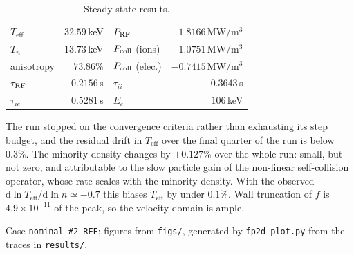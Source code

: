 \documentclass[11pt,a4paper]{article}
\newcommand{\code}[1]{\texttt{\small #1}}
\newcommand{\Teff}{T_{\mathrm{eff}}}
\begin{document}
\begin{table}[h]
\centering\small
\caption{Steady-state results.}
\begin{tabular}{@{}lr@{\hskip 2.2em}lr@{}}
\toprule
$\Teff$              & $32.59\,$keV            & $P_{\rm RF}$          & $1.8166\,$MW/m$^3$ \\
$T_n$                & $13.73\,$keV            & $P_{\rm coll}$ (ions) & $-1.0751\,$MW/m$^3$ \\
anisotropy           & $73.86\%$               & $P_{\rm coll}$ (elec.)& $-0.7415\,$MW/m$^3$ \\
$\tau_{\rm RF}$      & $0.2156\,$s             & $\tau_{ii}$           & $0.3643\,$s \\
$\tau_{ie}$          & $0.5281\,$s             & $E_c$                 & $106\,$keV \\
\bottomrule
\end{tabular}
\end{table}

The run stopped on the convergence criteria rather than exhausting its step
budget, and the residual drift in $\Teff$ over the final quarter of the run is
below $0.3\%$. The minority density changes by $+0.127\%$ over the whole run:
small, but not zero, and attributable to the slow particle gain of the
non-linear self-collision operator, whose rate scales with the minority density.
With the observed $\mathrm{d}\ln\Teff/\mathrm{d}\ln n\simeq-0.7$ this biases
$\Teff$ by under $0.1\%$. Wall truncation of $f$ is $4.9\times10^{-11}$ of the
peak, so the velocity domain is ample.

\vspace{0.2cm}
\noindent\footnotesize
Case \code{nominal\_\#2--REF}; figures from \code{figs/}, generated by
\code{fp2d\_plot.py} from the traces in \code{results/}.
\end{document}
